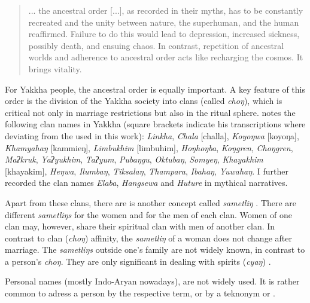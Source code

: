\begin{quote}
... the  ancestral order [...], as recorded in their myths, has to be constantly recreated and the unity between nature, the superhuman, and the human reaffirmed. Failure to do this would lead to depression, increased sickness, possibly death, and ensuing chaos. In contrast, repetition of ancestral worlds and adherence to ancestral order acts like recharging the cosmos. It brings vitality. \citep[12-3]{Hardman2000_Other}
\end{quote}

For  Yakkha people, the ancestral order is equally important. A key feature of this order is the division of the Yakkha society into clans (called \emph{choŋ}), which is critical not only in marriage restrictions but also in the ritual sphere. \citet[201]{Russell1992_Yakha} notes the following clan names in Yakkha (square brackets indicate his transcriptions where deviating from the  used in this work): \emph{Linkha}, \emph{Chala} [challa], \emph{Koyoŋwa} [koyoŋa], \emph{Khamyahaŋ} [kammieŋ], \emph{Limbukhim} [limbuhim], \emph{Hoŋhoŋba}, \emph{Koŋgren}, \emph{Choŋgren}, \emph{Maʔkruk}, \emph{Yaʔyukhim}, \emph{Taʔyum}, \emph{Pubaŋgu}, \emph{Oktubaŋ}, \emph{Somyeŋ}, \emph{Khayakhim} [khayakim], \emph{Heŋwa}, \emph{Ilumbaŋ}, \emph{Tiksalaŋ}, \emph{Thampara}, \emph{Ibahaŋ}, \emph{Yuwahaŋ}. I further recorded the clan names \emph{Elaba}, \emph{Hangsewa} and \emph{Huture} in mythical narratives. 

Apart from these clans, there are is another concept called \emph{sametliŋ} . There are different  \emph{sametliŋs} for the women and for the men of each clan. Women of one clan may, however, share their spiritual clan with men of another clan. In contrast to clan  (\emph{choŋ}) affinity, the \emph{sametliŋ} of a woman does not change after marriage. The \emph{sametliŋs} outside one's family are not widely known, in contrast to a person's \emph{choŋ}. They are only significant in dealing with spirits (\emph{cyaŋ}) \citep[166]{Russell1992_Yakha}.

Personal names (mostly Indo-Aryan nowadays), are not widely used. It is rather common to adress a person by the respective  term, or by a teknonym  or . 

